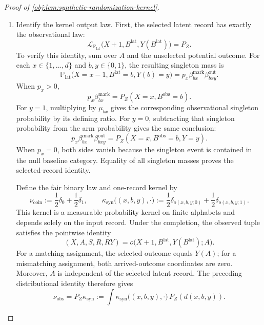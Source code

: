\documentclass[11pt]{article}
\begin{document}
\begin{proof}[Proof of \cref{obj:lem:synthetic-randomization-kernel}]
\begin{enumerate}
\item Identify the kernel output law. First, the selected latent record has exactly the observational law:
\[
\mathcal L_{\mathbb P_{\mathrm{lat}}}
\bigl(X+1,B^{\mathrm{lat}},Y(B^{\mathrm{lat}})\bigr)=P_Z.
\]
To verify this identity, sum over \(A\) and the unselected potential outcome. For each \(x\in\{1,\ldots,d\}\) and \(b,y\in\{0,1\}\), the resulting singleton mass is
\[
\mathbb P_{\mathrm{lat}}
\bigl(X=x-1,B^{\mathrm{lat}}=b,Y(b)=y\bigr)
=
p_x\beta^{\mathrm{mark}}_{bx}\beta^{\mathrm{out}}_{bxy}.
\]
When \(p_x>0\),
\[
p_x\beta^{\mathrm{mark}}_{bx}
=P_Z(X=x,B^{\mathrm{obs}}=b).
\]
For \(y=1\), multiplying by \(\mu_{bx}\) gives the corresponding observational singleton probability by its defining ratio. For \(y=0\), subtracting that singleton probability from the arm probability gives the same conclusion:
\[
p_x\beta^{\mathrm{mark}}_{bx}\beta^{\mathrm{out}}_{bxy}
=P_Z(X=x,B^{\mathrm{obs}}=b,Y=y).
\]
When \(p_x=0\), both sides vanish because the singleton event is contained in the null baseline category. Equality of all singleton masses proves the selected-record identity.

Define the fair binary law and one-record kernel by
\[
\nu_{\mathrm{coin}}:=\frac12\delta_0+\frac12\delta_1,
\qquad
\kappa_{\mathrm{syn}}\bigl((x,b,y),\cdot\bigr)
:=
\frac12\delta_{o(x,b,y;0)}
+\frac12\delta_{o(x,b,y;1)}.
\]
This kernel is a measurable probability kernel on finite alphabets and depends solely on the input record. Under the completion, the observed tuple satisfies the pointwise identity
\[
(X,A,S,R,RY)
=
o\bigl(X+1,B^{\mathrm{lat}},Y(B^{\mathrm{lat}});A\bigr).
\]
For a matching assignment, the selected outcome equals \(Y(A)\); for a mismatching assignment, both arrived-outcome coordinates are zero. Moreover, \(A\) is independent of the selected latent record. The preceding distributional identity therefore gives
\[
\nu_{\mathrm{obs}}
=
P_Z\kappa_{\mathrm{syn}}
:=
\int\kappa_{\mathrm{syn}}\bigl((x,b,y),\cdot\bigr)\,
P_Z(d(x,b,y)).
\]


\end{enumerate}
\end{proof}
\end{document}
